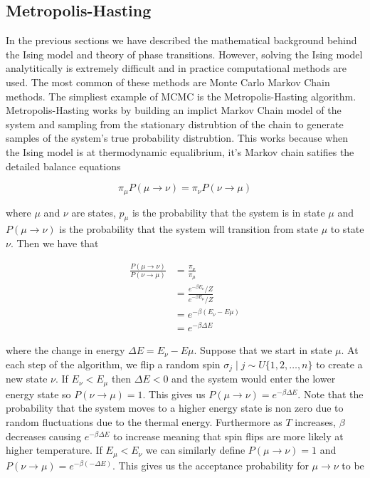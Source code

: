 \documentclass{article}
\begin{document}
\subsection{Metropolis-Hasting}
In the previous sections we have described the mathematical background behind the Ising model and theory of phase transitions.
However, solving the Ising model analytitically is extremely difficult and in practice computational methods are used. The most common of these methods 
are Monte Carlo Markov Chain methods. The simpliest example of MCMC is the Metropolis-Hasting algorithm. Metropolis-Hasting works by building 
an implict Markov Chain model of the system and sampling from the stationary distrubtion of the chain to generate samples of the system's true probability
distrubtion. This works because when the Ising model is at thermodynamic equalibrium, it's Markov chain satifies the detailed balance equations

\begin{equation}
    \pi_{\mu} P(\mu \rightarrow \nu) = \pi_{\nu} P(\nu \rightarrow \mu)
\end{equation}

where $\mu$ and $\nu$ are states, $p_{\mu}$ is the probability that the system is in state $\mu$ and $P(\mu \rightarrow \nu)$
is the probability that the system will transition from state $\mu$ to state $\nu$. Then we have that 

\begin{align}
    \frac{P(\mu \rightarrow \nu)}{P(\nu \rightarrow \mu)}
    &= \frac{\pi_{\nu}}{\pi_{\mu}} \\
    &= \frac{e^{-\beta E_{\nu}} / Z}{e^{-\beta E_{\mu}} / Z} \\
    &= e^{-\beta(E_{\nu} - E{\mu})} \\
    &= e^{-\beta \Delta E}
\end{align}

where the change in energy $\Delta E = E_{\nu} - E{\mu}$. Suppose that we start in state $\mu$. At each step of the algorithm, we flip a random spin $\sigma_j \mid j \sim U\{1,2,\ldots,n\}$ to create a new state $\nu$.
If $E_{\nu} < E_{\mu}$ then $\Delta E < 0$ and the system would enter the lower energy state so $P(\nu \rightarrow \mu) = 1$. This gives us
$P(\mu \rightarrow \nu) = e^{-\beta \Delta E}$. Note that the probability that the system moves to a higher energy state 
is non zero due to random fluctuations due to the thermal energy. Furthermore as $T$ increases, $\beta$ decreases causing $e^{-\beta \Delta E}$
to increase meaning that spin flips are more likely at higher temperature. If $E_{\mu} < E_{\nu}$ we can similarly define $P(\mu \rightarrow \nu) = 1$
and $P(\nu \rightarrow \mu) = e^{-\beta(-\Delta E)}$. This gives us the acceptance probability for $\mu \rightarrow \nu$ to be
\end{document}
